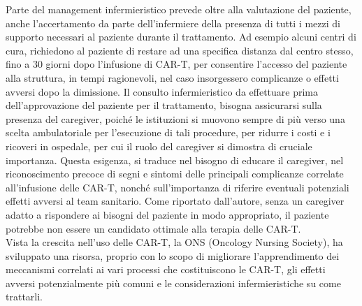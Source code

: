 Parte del management infermieristico prevede oltre alla valutazione del paziente, anche l’accertamento da parte 
dell’infermiere della presenza di tutti i mezzi di supporto necessari al paziente durante il trattamento. 
Ad esempio alcuni centri di cura, richiedono al paziente di restare ad una specifica distanza dal centro stesso, 
fino a 30 giorni dopo l’infusione di CAR-T, per consentire l’accesso del paziente alla struttura, in tempi ragionevoli, 
nel caso insorgessero complicanze o effetti avversi dopo la dimissione. Il consulto infermieristico da effettuare 
prima dell’approvazione del paziente per il trattamento, bisogna assicurarsi sulla presenza del caregiver, 
poiché le istituzioni si muovono sempre di più verso una scelta ambulatoriale per l’esecuzione di tali procedure, 
per ridurre i costi e i ricoveri in ospedale, per cui il ruolo del caregiver si dimostra di cruciale importanza. 
Questa esigenza, si traduce nel bisogno di educare il caregiver, nel riconoscimento precoce di segni e sintomi delle 
principali complicanze correlate all’infusione delle CAR-T, nonché sull’importanza di riferire eventuali potenziali 
effetti avversi al team sanitario. Come riportato dall’autore, senza un caregiver adatto a rispondere ai 
bisogni del paziente in modo appropriato, il paziente potrebbe non essere un candidato ottimale 
alla terapia delle CAR-T\cite{article2}.\\

Vista la crescita nell’uso delle CAR-T, la ONS (Oncology Nursing Society), ha sviluppato una risorsa, 
proprio con lo scopo di migliorare l’apprendimento dei meccanismi correlati ai vari processi che costituiscono 
le CAR-T, gli effetti avversi potenzialmente più comuni e le considerazioni infermieristiche su come trattarli\cite{ONSCART}.\\

